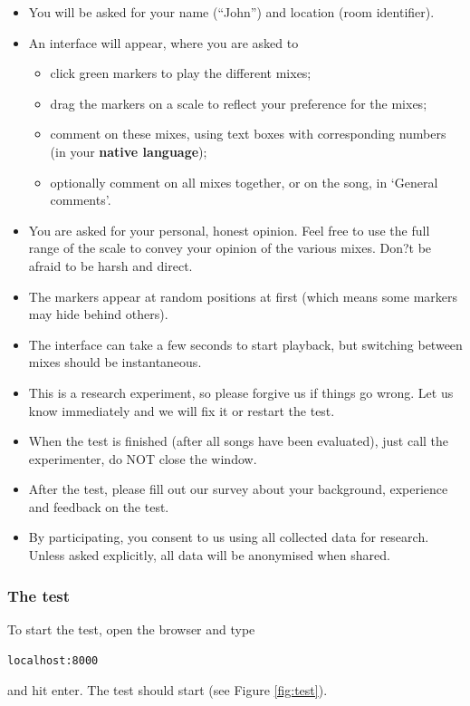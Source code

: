\documentclass[11pt, oneside]{article}   	%
\begin{document}
			\begin{itemize}
			\item You will be asked for your name (``John'') and location (room identifier). 
			\item An interface will appear, where you are asked to 
			\begin{itemize}
				\item click green markers to play the different mixes;
				\item drag the markers on a scale to reflect your preference for the mixes;
				\item comment on these mixes, using text boxes with corresponding numbers (in your \textbf{native language});
				\item optionally comment on all mixes together, or on the song, in `General comments'. 
			\end{itemize}
			\item You are asked for your personal, honest opinion. Feel free to use the full range of the scale to convey your opinion of the various mixes. Don?t be afraid to be harsh and direct. 
			\item The markers appear at random positions at first (which means some markers may hide behind others). 
			\item The interface can take a few seconds to start playback, but switching between mixes should be instantaneous. 
			\item This is a research experiment, so please forgive us if things go wrong. Let us know immediately and we will fix it or restart the test.  
			\item When the test is finished (after all songs have been evaluated), just call the experimenter, do NOT close the window.  
			\item After the test, please fill out our survey about your background, experience and feedback on the test. 
			\item By participating, you consent to us using all collected data for research. Unless asked explicitly, all data will be anonymised when shared. 
			\end{itemize}

		
		\subsubsection{The test}
			To start the test, open the browser and type 
			
			\texttt{localhost:8000}
			
			and hit enter. The test should start (see Figure \ref{fig:test}). 
			
\end{document}
